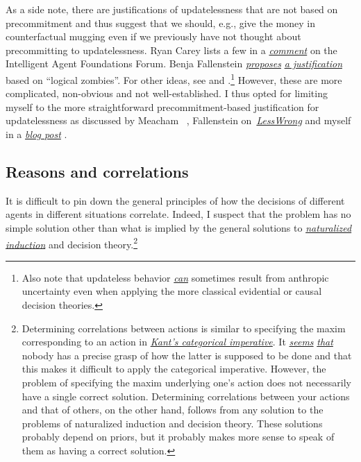 As a side note, there are justifications of updatelessness that are not
based on precommitment and thus suggest that we should, e.g., give the
money in counterfactual mugging even if we previously have not thought
about precommitting to updatelessness. Ryan Carey lists a few in a
\href{https://agentfoundations.org/item?id=1199}{\emph{comment}} on the
Intelligent Agent Foundations Forum. Benja Fallenstein
\href{http://lesswrong.com/lw/jkm/lzombies_lzombies/}{\emph{proposes}}
\href{http://lesswrong.com/lw/jpr/sudt_a_toy_decision_theory_for_updateless/}{\emph{a
justification}} based on ``logical zombies''. For other ideas, see
\parencite{Armstrong2011-sz} and
\parencite{Drescher2006-ky}.\footnote{Also note that
  updateless behavior
  \href{https://casparoesterheld.com/2017/05/12/anthropic-uncertainty-in-the-evidential-blackmail/}{\emph{can}}
  sometimes result from anthropic uncertainty even when applying the
  more classical evidential or causal decision theories.} However, these
are more complicated, non-obvious and not well-established. I thus opted
for limiting myself to the more straightforward precommitment-based
justification for updatelessness as discussed by Meacham~
\parencite{Meacham2010-pk}, Fallenstein on~\href{http://lesswrong.com/lw/22m/selfmodification_is_the_correct_justification_for/}{\emph{LessWrong}} and myself in a
\href{https://casparoesterheld.com/2016/11/21/thoughts-on-updatelessnes/}{\emph{blog post}}
\parencite{Ahmed2012-ue}.

\hypertarget{reasons-and-correlations}{\subsection{Reasons and
correlations }\label{reasons-and-correlations}}

It is difficult to pin down the general principles of how the decisions
of different agents in different situations correlate. Indeed, I suspect
that the problem has no simple solution other than what is implied by
the general solutions to
\href{https://wiki.lesswrong.com/wiki/Naturalized_induction}{\emph{naturalized
induction}} \parencite{Soares2014-hg,Soares2015-hu} and
decision theory.\footnote{Determining correlations between actions is
  similar to specifying the maxim corresponding to an action in
  \href{https://en.wikipedia.org/wiki/Categorical_imperative}{\emph{Kant's
  categorical imperative}}. It
  \href{http://briantomasik.com/interpreting-the-categorical-imperative/\#If_everyone_did_what}{\emph{seems}}
  \href{https://welovephilosophy.com/2013/01/07/choosing-a-kantian-maxim/}{\emph{that}}
  nobody has a precise grasp of how the latter is supposed to be done
  and that this makes it difficult to apply the categorical imperative.
  However, the problem of specifying the maxim underlying one's action
  does not necessarily have a single correct solution. Determining
  correlations between your actions and that of others, on the other
  hand, follows from any solution to the problems of naturalized
  induction and decision theory. These solutions probably depend on
  priors, but it probably makes more sense to speak of them as having a
  correct solution.}

